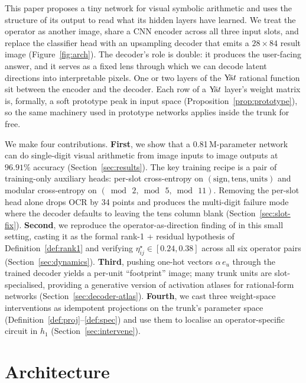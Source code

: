 \documentclass[11pt]{article}
\theoremstyle{papsty}
\newcommand{\yat}{$\textnormal{Y}\!\bar{\text{a}}t$}
\begin{document}
This paper proposes a tiny network for visual symbolic arithmetic and
uses the structure of its output to read what its hidden layers have
learned.
We treat the operator as another image, share a CNN encoder across all
three input slots, and replace the classifier head with an upsampling
decoder that emits a $28 \times 84$ result image (Figure~\ref{fig:arch}).
The decoder's role is double: it produces the user-facing answer, and it
serves as a fixed lens through which we can decode latent directions
into interpretable pixels. One or two layers of the
\yat{}
rational function sit between the encoder and the decoder. Each row of a
\yat{} layer's weight matrix is, formally, a soft prototype peak in input
space (Proposition~\ref{prop:prototype}), so the same machinery used in
prototype networks \citep{snell2017prototypical} applies inside the trunk
for free.

We make four contributions.
\textbf{First}, we show that a 0.81\,M-parameter network can do
single-digit visual arithmetic from image inputs to image outputs at
$96.91\%$ accuracy (Section~\ref{sec:results}).
The key training recipe is a pair of training-only auxiliary heads:
per-slot cross-entropy on $(\text{sign}, \text{tens}, \text{units})$ and
modular cross-entropy on $(\bmod\,2, \bmod\,5, \bmod\,11)$.
Removing the per-slot head alone drops OCR by 34 points and produces
the multi-digit failure mode where the decoder defaults to leaving the
tens column blank (Section~\ref{sec:slot-fix}).
\textbf{Second}, we reproduce the operator-as-direction finding of
\citet{goodfire2025geometric} in this small setting, casting it as the
formal rank-1 + residual hypothesis of Definition~\ref{def:rank1} and
verifying $\eta^\star_{ij} \in [0.24, 0.38]$ across all six operator
pairs (Section~\ref{sec:dynamics}).
\textbf{Third}, pushing one-hot vectors $\alpha\,e_{u}$ through the trained
decoder yields a per-unit ``footprint'' image; many trunk units are
slot-specialised, providing a generative version of activation
atlases \citep{olah2017feature} for rational-form networks
(Section~\ref{sec:decoder-atlas}).
\textbf{Fourth}, we cast three weight-space interventions as idempotent
projections on the trunk's parameter space
(Definition~\ref{def:proj}--\ref{def:spec}) and use them to localise an
operator-specific circuit in $h_1$
(Section~\ref{sec:intervene}).

\section{Architecture}
\label{sec:arch}
\end{document}
